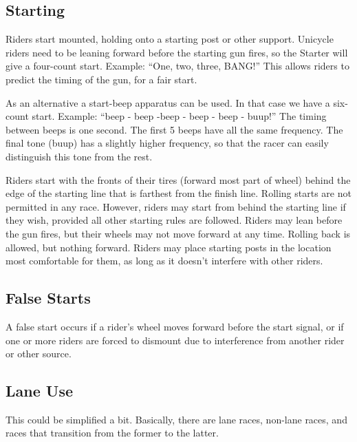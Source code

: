 \subsection{Starting}

Riders start mounted, holding onto a starting post or other support.
Unicycle riders need to be leaning forward before the starting gun fires, so the Starter will give a four-count start.
Example: ``One, two, three, BANG!''
This allows riders to predict the timing of the gun, for a fair start.

As an alternative a start-beep apparatus can be used.
In that case we have a six-count start.
Example: ``beep - beep -beep - beep - beep - buup!''
The timing between beeps is one second.
The first 5 beeps have all the same frequency.
The final tone (buup) has a slightly higher frequency, so that the racer can easily distinguish this tone from the rest.

Riders start with the fronts of their tires (forward most part of wheel) behind the edge of the starting line that is farthest from the finish line.
Rolling starts are not permitted in any race.
However, riders may start from behind the starting line if they wish, provided all other starting rules are followed.
Riders may lean before the gun fires, but their wheels may not move forward at any time.
Rolling back is allowed, but nothing forward.
Riders may place starting posts in the location most comfortable for them, as long as it doesn't interfere with other riders.

\subsection{False Starts}

A false start occurs if a rider's wheel moves forward before the start signal, or if one or more riders are forced to dismount due to interference from another rider or other source. 

\subsection{Lane Use}

\begin{comment-2016}
This could be simplified a bit.  Basically, there are lane races, non-lane races, and races that transition from the former to the latter.
\end{comment-2016}

